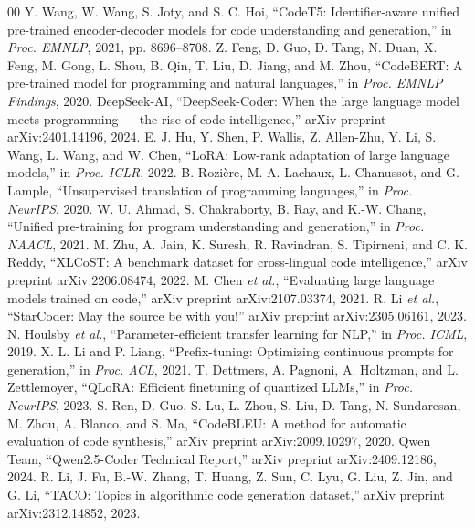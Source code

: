 \documentclass[conference]{IEEEtran}
\begin{document}
\begin{thebibliography}{00}
 Y. Wang, W. Wang, S. Joty, and S. C. Hoi, ``CodeT5: Identifier-aware unified pre-trained encoder-decoder models for code understanding and generation,'' in \textit{Proc. EMNLP}, 2021, pp. 8696--8708.
 Z. Feng, D. Guo, D. Tang, N. Duan, X. Feng, M. Gong, L. Shou, B. Qin, T. Liu, D. Jiang, and M. Zhou, ``CodeBERT: A pre-trained model for programming and natural languages,'' in \textit{Proc. EMNLP Findings}, 2020.
 DeepSeek-AI, ``DeepSeek-Coder: When the large language model meets programming --- the rise of code intelligence,'' arXiv preprint arXiv:2401.14196, 2024.
 E. J. Hu, Y. Shen, P. Wallis, Z. Allen-Zhu, Y. Li, S. Wang, L. Wang, and W. Chen, ``LoRA: Low-rank adaptation of large language models,'' in \textit{Proc. ICLR}, 2022.
 B. Rozière, M.-A. Lachaux, L. Chanussot, and G. Lample, ``Unsupervised translation of programming languages,'' in \textit{Proc. NeurIPS}, 2020.
 W. U. Ahmad, S. Chakraborty, B. Ray, and K.-W. Chang, ``Unified pre-training for program understanding and generation,'' in \textit{Proc. NAACL}, 2021.
 M. Zhu, A. Jain, K. Suresh, R. Ravindran, S. Tipirneni, and C. K. Reddy, ``XLCoST: A benchmark dataset for cross-lingual code intelligence,'' arXiv preprint arXiv:2206.08474, 2022.
 M. Chen \textit{et al.}, ``Evaluating large language models trained on code,'' arXiv preprint arXiv:2107.03374, 2021.
 R. Li \textit{et al.}, ``StarCoder: May the source be with you!'' arXiv preprint arXiv:2305.06161, 2023.
 N. Houlsby \textit{et al.}, ``Parameter-efficient transfer learning for NLP,'' in \textit{Proc. ICML}, 2019.
 X. L. Li and P. Liang, ``Prefix-tuning: Optimizing continuous prompts for generation,'' in \textit{Proc. ACL}, 2021.
 T. Dettmers, A. Pagnoni, A. Holtzman, and L. Zettlemoyer, ``QLoRA: Efficient finetuning of quantized LLMs,'' in \textit{Proc. NeurIPS}, 2023.
 S. Ren, D. Guo, S. Lu, L. Zhou, S. Liu, D. Tang, N. Sundaresan, M. Zhou, A. Blanco, and S. Ma, ``CodeBLEU: A method for automatic evaluation of code synthesis,'' arXiv preprint arXiv:2009.10297, 2020.
 Qwen Team, ``Qwen2.5-Coder Technical Report,'' arXiv preprint arXiv:2409.12186, 2024.
 R. Li, J. Fu, B.-W. Zhang, T. Huang, Z. Sun, C. Lyu, G. Liu, Z. Jin, and G. Li, ``TACO: Topics in algorithmic code generation dataset,'' arXiv preprint arXiv:2312.14852, 2023.
\end{thebibliography}
\end{document}
